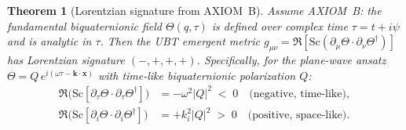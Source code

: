 \documentclass[12pt]{article}
\newtheorem{theorem}{Theorem}[section]
\theoremstyle{definition}
\theoremstyle{remark}
\begin{document}
\begin{theorem}[Lorentzian signature from AXIOM~B]
\label{thm:axiomB_signature}
Assume AXIOM~B: the fundamental biquaternionic field $\Theta(q,\tau)$ is defined over
complex time $\tau = t + i\psi$ and is analytic in $\tau$.
Then the UBT emergent metric $g_{\mu\nu} = \Re[\mathrm{Sc}(\partial_\mu\Theta\cdot\partial_\nu\Theta^\dagger)]$
has Lorentzian signature $(-,+,+,+)$.  Specifically, for the plane-wave ansatz
$\Theta = Q\,e^{i(\omega\tau - \mathbf{k}\cdot\mathbf{x})}$ with time-like
biquaternionic polarization $Q$:
\begin{align}
  \Re\!\bigl(\mathrm{Sc}[\partial_\tau\Theta\cdot\partial_\tau\Theta^\dagger]\bigr)
  &= -\omega^2 |{Q}|^2 \;<\; 0
  \quad\text{(negative, time-like)},
  \label{eq:axiomB_time}
  \\
  \Re\!\bigl(\mathrm{Sc}[\partial_i\Theta\cdot\partial_i\Theta^\dagger]\bigr)
  &= +k_i^2 |{Q}|^2 \;>\; 0
  \quad\text{(positive, space-like)}.
  \label{eq:axiomB_space}
\end{align}
\end{theorem}
\end{document}
